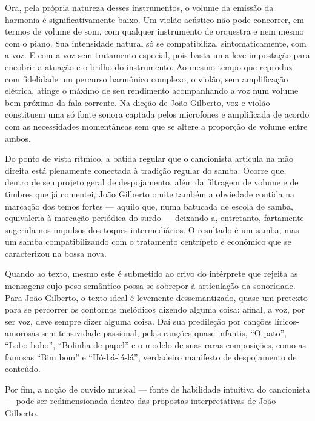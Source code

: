 Ora, pela própria natureza desses instrumentos, o volume da emissão da
harmonia é significativamente baixo. Um violão acústico não pode
concorrer, em termos de volume de som, com qualquer instrumento de
orquestra e nem mesmo com o piano. Sua intensidade natural só se
compatibiliza, sintomaticamente, com a voz. E com a voz sem tratamento
especial, pois basta uma leve impostação para encobrir a atuação e o
brilho do instrumento. Ao mesmo tempo que reproduz com fidelidade um
percurso harmônico complexo, o violão, sem amplificação elétrica, atinge
o máximo de seu rendimento acompanhando a voz num volume bem próximo da
fala corrente. Na dicção de João Gilberto, voz e violão constituem uma
só fonte sonora captada pelos microfones e amplificada de acordo com as
necessidades momentâneas sem que se altere a proporção de volume entre
ambos.

Do ponto de vista rítmico, a batida regular que o cancionista articula
na mão direita está plenamente conectada à tradição regular do samba.
Ocorre que, dentro de seu projeto geral de despojamento, além da
filtragem de volume e de timbres que já comentei, João Gilberto omite
também a obviedade contida na marcação dos temos fortes --- aquilo que,
numa batucada de escola de samba, equivaleria à marcação periódica do
surdo --- deixando-a, entretanto, fartamente sugerida nos impulsos dos
toques intermediários. O resultado é um samba, mas um samba
compatibilizando com o tratamento centrípeto e econômico que se
caracterizou na bossa nova.

Quando ao texto, mesmo este é submetido ao crivo do intérprete que
rejeita as mensagens cujo peso semântico possa se sobrepor à articulação
da sonoridade. Para João Gilberto, o texto ideal é levemente
dessemantizado, quase um pretexto para se percorrer os contornos
melódicos dizendo alguma coisa: afinal, a voz, por ser voz, deve sempre
dizer alguma coisa. Daí sua predileção por canções líricos-amorosas sem
tensividade passional, pelas canções quase infantis, ``O pato'', ``Lobo bobo'',
``Bolinha de papel'' e o modelo de suas raras composições, como as famosas
``Bim bom'' e ``Hó-bá-lá-lá'', verdadeiro manifesto de despojamento de
conteúdo.

Por fim, a noção de ouvido musical --- fonte de habilidade intuitiva do
cancionista --- pode ser redimensionada dentro das propostas
interpretativas de João Gilberto.

